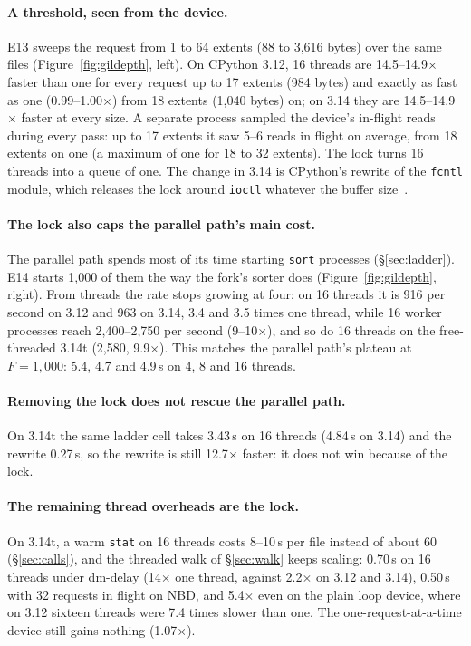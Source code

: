 \paragraph{A threshold, seen from the device.} E13 sweeps the request from 1 to 64
extents (88 to 3{,}616 bytes) over the same files (Figure~\ref{fig:gildepth}, left). On
CPython 3.12, 16 threads are 14.5--14.9$\times$ faster than one for every request up to
17 extents (984 bytes) and exactly as fast as one (0.99--1.00$\times$) from 18 extents
(1{,}040 bytes) on; on 3.14 they are 14.5--14.9$\times$ faster at every size. A separate
process sampled the device's in-flight reads during every pass: up to 17 extents it saw
5--6 reads in flight on average, from 18 extents on one (a maximum of one for 18 to 32
extents). The lock turns 16 threads into a queue of one. The change in 3.14 is CPython's
rewrite of the \texttt{fcntl} module, which releases the lock around \texttt{ioctl}
whatever the buffer size~\cite{cpython132742}.

\paragraph{The lock also caps the parallel path's main cost.} The parallel path spends
most of its time starting \texttt{sort} processes (\S\ref{sec:ladder}). E14 starts 1{,}000
of them the way the fork's sorter does (Figure~\ref{fig:gildepth}, right). From threads
the rate stops growing at four: on 16 threads it is 916 per second on 3.12 and 963 on
3.14, 3.4 and 3.5 times one thread, while 16 worker processes reach 2{,}400--2{,}750 per
second (9--10$\times$), and so do 16 threads on the free-threaded 3.14t (2{,}580,
9.9$\times$).
This matches the parallel path's plateau at $F = 1{,}000$: 5.4, 4.7 and 4.9\,s on 4, 8
and 16 threads.

\paragraph{Removing the lock does not rescue the parallel path.} On 3.14t the same
ladder cell takes 3.43\,s on 16 threads (4.84\,s on 3.14) and the rewrite 0.27\,s, so the
rewrite is still 12.7$\times$ faster: it does not win because of the lock.

\paragraph{The remaining thread overheads are the lock.} On 3.14t, a warm \texttt{stat}
on 16 threads costs 8--10\,\textmu s per file instead of about 60
(\S\ref{sec:calls}), and the threaded walk of \S\ref{sec:walk} keeps scaling: 0.70\,s on
16 threads under dm-delay (14$\times$ one thread, against 2.2$\times$ on 3.12 and 3.14),
0.50\,s with 32 requests in flight on NBD, and 5.4$\times$ even on the plain loop device,
where on 3.12 sixteen threads were 7.4 times slower than one. The
one-request-at-a-time device still gains nothing (1.07$\times$).

